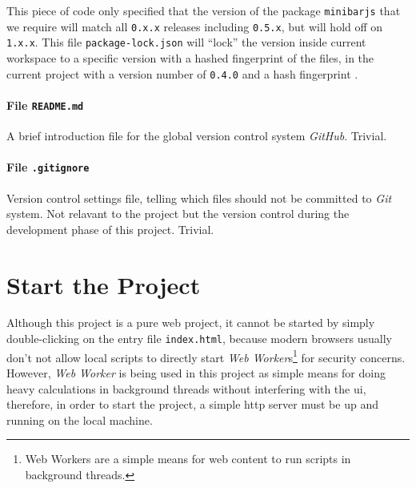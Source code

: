 This piece of code only specified that the version of the package \texttt{minibarjs} that we require will match all \texttt{0.x.x} releases including \texttt{0.5.x}, but will hold off on \texttt{1.x.x}. This file \texttt{package-lock.json} will ``lock'' the version inside current workspace to a specific version with a hashed fingerprint of the files, in the current project with a version number of \texttt{0.4.0} and a hash fingerprint .

\paragraph{File \texttt{README.md}}

A brief introduction file for the global version control system \emph{GitHub}. Trivial.

\paragraph{File \texttt{.gitignore}}

Version control settings file, telling which files should not be committed to \emph{Git} system. Not relavant to the project but the version control during the development phase of this project. Trivial.


\section{Start the Project}\label{chap4:starttheproject}

Although this project is a pure web project, it cannot be started by simply double-clicking on the entry file \texttt{index.html}, because modern browsers usually don't not allow local scripts to directly start \emph{Web Worker}s\footnote{ Web Workers are a simple means for web content to run scripts in background threads.\cite{bib:moz:webworker}} for security concerns. However, \emph{Web Worker} is being used in this project as simple means for doing heavy calculations in background threads without interfering with the \gls{ui}, therefore, in order to start the project, a simple \gls{http} server must be up and running on the local machine.

